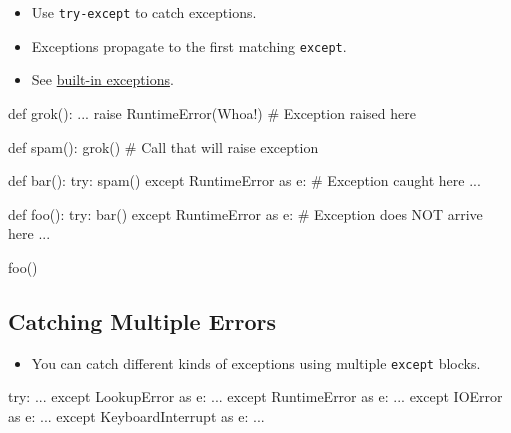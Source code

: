 \documentclass[
  letterpaper,
  DIV=11,
  numbers=noendperiod]{scrreprt}
\newenvironment{Shaded}{\begin{snugshade}}{\end{snugshade}}
\newcommand{\CommentTok}[1]{\textcolor[rgb]{0.37,0.37,0.37}{#1}}
\newcommand{\ControlFlowTok}[1]{\textcolor[rgb]{0.00,0.46,0.62}{#1}}
\newcommand{\ImportTok}[1]{\textcolor[rgb]{0.00,0.46,0.62}{#1}}
\newcommand{\KeywordTok}[1]{\textcolor[rgb]{0.00,0.46,0.62}{#1}}
\newcommand{\NormalTok}[1]{\textcolor[rgb]{0.00,0.46,0.62}{#1}}
\newcommand{\PreprocessorTok}[1]{\textcolor[rgb]{0.68,0.00,0.00}{#1}}
\newcommand{\StringTok}[1]{\textcolor[rgb]{0.13,0.47,0.30}{#1}}
\providecommand{\tightlist}{%
  \setlength{\itemsep}{0pt}\setlength{\parskip}{0pt}}
\begin{document}
\begin{itemize}
\tightlist
\item
  Use \texttt{try-except} to catch exceptions.
\item
  Exceptions propagate to the first matching \texttt{except}.
\item
  See \href{https://docs.python.org/3/library/exceptions.html}{built-in
  exceptions}.
\end{itemize}

\begin{Shaded}
\begin{Highlighting}[]
\KeywordTok{def}\NormalTok{ grok():}
\NormalTok{    ...}
    \ControlFlowTok{raise} \PreprocessorTok{RuntimeError}\NormalTok{(}\StringTok{\textquotesingle{}Whoa!\textquotesingle{}}\NormalTok{)   }\CommentTok{\# Exception raised here}

\KeywordTok{def}\NormalTok{ spam():}
\NormalTok{    grok()                        }\CommentTok{\# Call that will raise exception}

\KeywordTok{def}\NormalTok{ bar():}
    \ControlFlowTok{try}\NormalTok{:}
\NormalTok{       spam()}
    \ControlFlowTok{except} \PreprocessorTok{RuntimeError} \ImportTok{as}\NormalTok{ e:     }\CommentTok{\# Exception caught here}
\NormalTok{        ...}

\KeywordTok{def}\NormalTok{ foo():}
    \ControlFlowTok{try}\NormalTok{:}
\NormalTok{         bar()}
    \ControlFlowTok{except} \PreprocessorTok{RuntimeError} \ImportTok{as}\NormalTok{ e:     }\CommentTok{\# Exception does NOT arrive here}
\NormalTok{        ...}

\NormalTok{foo()}
\end{Highlighting}
\end{Shaded}

\hypertarget{catching-multiple-errors}{%
\subsection{Catching Multiple Errors}\label{catching-multiple-errors}}

\begin{itemize}
\tightlist
\item
  You can catch different kinds of exceptions using multiple
  \texttt{except} blocks.
\end{itemize}

\begin{Shaded}
\begin{Highlighting}[]
\ControlFlowTok{try}\NormalTok{:}
\NormalTok{  ...}
\ControlFlowTok{except} \PreprocessorTok{LookupError} \ImportTok{as}\NormalTok{ e:}
\NormalTok{  ...}
\ControlFlowTok{except} \PreprocessorTok{RuntimeError} \ImportTok{as}\NormalTok{ e:}
\NormalTok{  ...}
\ControlFlowTok{except} \PreprocessorTok{IOError} \ImportTok{as}\NormalTok{ e:}
\NormalTok{  ...}
\ControlFlowTok{except} \PreprocessorTok{KeyboardInterrupt} \ImportTok{as}\NormalTok{ e:}
\NormalTok{  ...}
\end{Highlighting}
\end{Shaded}
\end{document}

